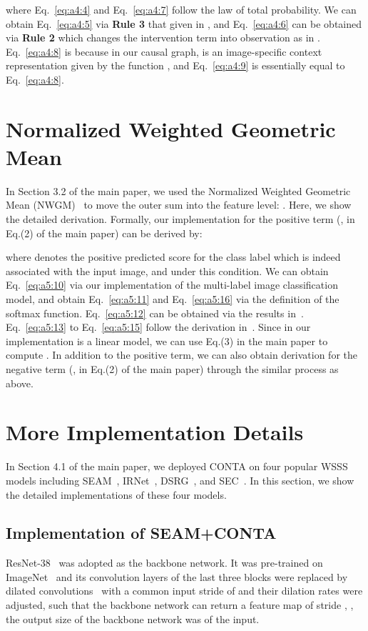 where Eq.~\ref{eq:a4:4} and Eq.~\ref{eq:a4:7} follow the law of total probability. We can obtain Eq.~\ref{eq:a4:5} via \textbf{Rule 3} that given  in , and Eq.~\ref{eq:a4:6} can be obtained via \textbf{Rule 2} which changes the intervention term into observation as  in . Eq.~\ref{eq:a4:8} is because in our causal graph,  is an image-specific context representation given by the function , and Eq.~\ref{eq:a4:9} is essentially equal to Eq.~\ref{eq:a4:8}.
\section{Normalized Weighted Geometric Mean}\label{sec:a2}
{\color{red}{This is Appendix to Section 3.2 ``Step 4. Computing ''.}}
In Section 3.2 of the main paper, we used the Normalized Weighted Geometric Mean (NWGM)~\cite{xu2015show} to move the outer sum  into the feature level: . Here, we show the detailed derivation. Formally, our implementation for the positive term (\ie,  in Eq.(2) of the main paper) can be derived by:
\vspace{4mm}

where  denotes the positive predicted score for the class label which is indeed associated with the input image, and  under this condition. We can obtain Eq.~\ref{eq:a5:10} via our implementation of the multi-label image classification model, and obtain Eq.~\ref{eq:a5:11} and Eq.~\ref{eq:a5:16} via the definition of the softmax function. Eq.~\ref{eq:a5:12} can be obtained via the results in~\cite{baldi2014dropout}. Eq.~\ref{eq:a5:13} to Eq.~\ref{eq:a5:15} follow the derivation in~\cite{xu2015show}. Since  in our implementation is a linear model, we can use Eq.(3) in the main paper to compute . In addition to the positive term, we can also obtain derivation for the negative term (\ie,  in Eq.(2) of the main paper) through the similar process as above.
\section{More Implementation Details}\label{sec:a3}
{\color{red}{This is Appendix to Section 4.1 ``Settings''.}}
In Section 4.1 of the main paper, we deployed CONTA on four popular WSSS models including SEAM~\cite{wang2020self}, IRNet~\cite{ahn2019weakly}, DSRG~\cite{huang2018weakly}, and SEC~\cite{kolesnikov2016seed}. In this section, we show the detailed implementations of these four models.


\subsection{Implementation of SEAM+CONTA}
 ResNet-38~\cite{wu2019wider} was adopted as the backbone network. It was pre-trained on ImageNet~\cite{deng2009imagenet} and its convolution layers of the last three blocks were replaced by dilated convolutions~\cite{yu2015multi} with a common input stride of  and their dilation rates were adjusted, such that the backbone network can return a feature map of stride , \ie, the output size of the backbone network was  of the input.

